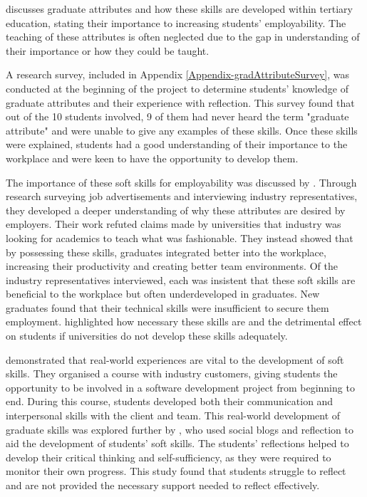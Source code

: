 \documentclass{l4proj}
\begin{document}
\citet{barr_2019} discusses graduate attributes and how these skills are developed within tertiary education, stating their importance to increasing students’ employability. The teaching of these attributes is often neglected due to the gap in understanding of their importance or how they could be taught.

A research survey, included in Appendix \ref{Appendix-gradAttributeSurvey}, was conducted at the beginning of the project to determine students' knowledge of graduate attributes and their experience with reflection. This survey found that out of the 10 students involved, 9 of them had never heard the term "graduate attribute" and were unable to give any examples of these skills. Once these skills were explained, students had a good understanding of their importance to the workplace and were keen to have the opportunity to develop them. 

The importance of these soft skills for employability was discussed by \citet{stevens_industry_2016}. Through research surveying job advertisements and interviewing industry representatives, they developed a deeper understanding of why these attributes are desired by employers. Their work refuted claims made by universities that industry was looking for academics to teach what was fashionable. They instead showed that by possessing these skills, graduates integrated better into the workplace, increasing their productivity and creating better team environments. Of the industry representatives interviewed, each was insistent that these soft skills are beneficial to the workplace but often underdeveloped in graduates. New graduates found that their technical skills were insufficient to secure them employment. \citet{stevens_industry_2016} highlighted how necessary these skills are and the detrimental effect on students if universities do not develop these skills adequately.

\citet{abernethy_teaching_2009} demonstrated that real-world experiences are vital to the development of soft skills. They organised a course with industry customers, giving students the opportunity to be involved in a software development project from beginning to end. During this course, students developed both their communication and interpersonal skills with the client and team. This real-world development of graduate skills was explored further by \citet{mcdermott_developing_nodate}, who used social blogs and reflection to aid the development of students' soft skills. The students' reflections helped to develop their critical thinking and self-sufficiency, as they were required to monitor their own progress. This study found that students struggle to reflect and are not provided the necessary support needed to reflect effectively. 
\end{document}

